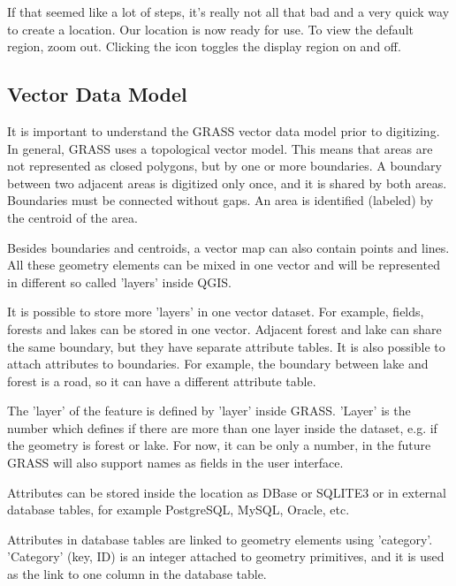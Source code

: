 If that seemed like a lot of steps, it's really not all that bad and a very 
quick way to create a location. Our location is now ready for use. To view 
the default region, zoom out. Clicking the  icon toggles the display region on and off. 

\subsection{Vector Data Model}\label{label_vectmodel}

It is important to understand the GRASS vector data model prior to
digitizing. In general, GRASS uses a topological
vector model. This means that areas are not represented
as closed polygons, but by one or more boundaries. A boundary between two
adjacent areas is digitized only once, and it is shared by both areas.
Boundaries must be connected without gaps. An area is identified (labeled) by
the centroid of the area.

Besides boundaries and centroids, a vector map can also contain
points and lines. All these geometry elements can be mixed
in one vector and will be represented in different so called 'layers' inside
QGIS.

It is possible to store more 'layers' in one vector dataset. For example,
fields, forests and lakes can be stored in one vector. Adjacent
forest and lake can share the same boundary, but they have separate attribute
tables. It is also possible to attach attributes to boundaries. For example,
the boundary between lake and forest is a road, so it can have a different 
attribute table.
 
The 'layer' of the feature is defined by 'layer' inside GRASS.
'Layer' is the number which defines if there are more than one layer inside the 
dataset, e.g. if the geometry is forest or lake.
For now, it can be only a number, in the future GRASS will also support  
names as fields in the user interface.

Attributes can be stored inside the location as DBase or SQLITE3 or in
external database tables, for example PostgreSQL, MySQL, Oracle, etc.

Attributes in database tables are linked to geometry elements using
'category'. 'Category' (key, ID) is an
integer attached to geometry primitives, and it is used as the link to one
column in the database table.

